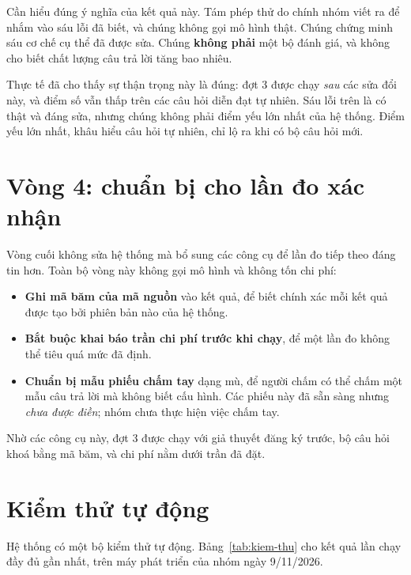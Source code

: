 Cần hiểu đúng ý nghĩa của kết quả này. Tám phép thử do chính nhóm viết ra để nhắm vào sáu lỗi đã biết, và chúng không gọi mô hình thật. Chúng chứng minh sáu cơ chế cụ thể đã được sửa. Chúng \textbf{không phải} một bộ đánh giá, và không cho biết chất lượng câu trả lời tăng bao nhiêu.

Thực tế đã cho thấy sự thận trọng này là đúng: đợt 3 được chạy \emph{sau} các sửa đổi này, và điểm số vẫn thấp trên các câu hỏi diễn đạt tự nhiên. Sáu lỗi trên là có thật và đáng sửa, nhưng chúng không phải điểm yếu lớn nhất của hệ thống. Điểm yếu lớn nhất, khâu hiểu câu hỏi tự nhiên, chỉ lộ ra khi có bộ câu hỏi mới.

\section{Vòng 4: chuẩn bị cho lần đo xác nhận}

Vòng cuối không sửa hệ thống mà bổ sung các công cụ để lần đo tiếp theo đáng tin hơn. Toàn bộ vòng này không gọi mô hình và không tốn chi phí:

\begin{itemize}
    \item \textbf{Ghi mã băm của mã nguồn} vào kết quả, để biết chính xác mỗi kết quả được tạo bởi phiên bản nào của hệ thống.
    \item \textbf{Bắt buộc khai báo trần chi phí trước khi chạy}, để một lần đo không thể tiêu quá mức đã định.
    \item \textbf{Chuẩn bị mẫu phiếu chấm tay} dạng mù, để người chấm có thể chấm một mẫu câu trả lời mà không biết cấu hình. Các phiếu này đã sẵn sàng nhưng \emph{chưa được điền}; nhóm chưa thực hiện việc chấm tay.
\end{itemize}

Nhờ các công cụ này, đợt 3 được chạy với giả thuyết đăng ký trước, bộ câu hỏi khoá bằng mã băm, và chi phí nằm dưới trần đã đặt.

\section{Kiểm thử tự động}

Hệ thống có một bộ kiểm thử tự động. Bảng~\ref{tab:kiem-thu} cho kết quả lần chạy đầy đủ gần nhất, trên máy phát triển của nhóm ngày 9/11/2026.

